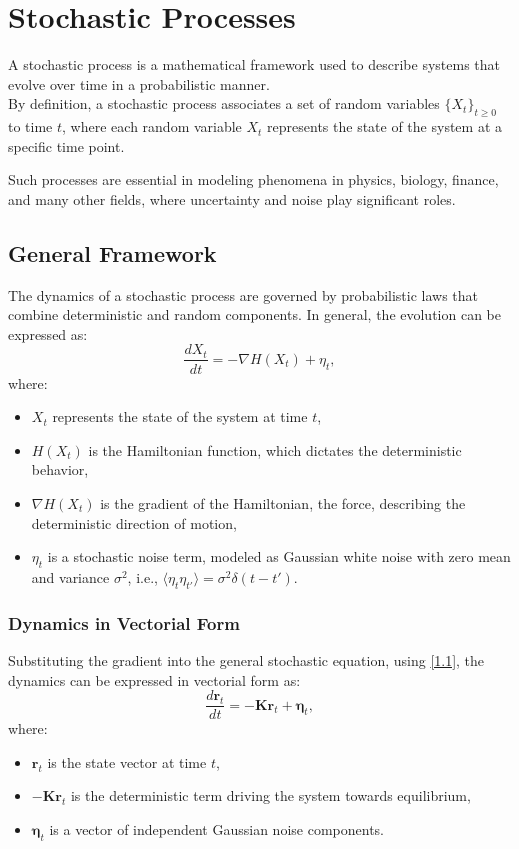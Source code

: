 \documentclass[English, Lau, oneside]{sapthesis}
\begin{document}
\chapter{Stochastic Processes}
A stochastic process is a mathematical framework used to describe systems that evolve over time in a probabilistic manner.\\
By definition, a stochastic process associates a set of random variables \( \{X_t\}_{t \geq 0} \) to time \( t \), where each random variable \( X_t \) represents the state of the system at a specific time point. 

Such processes are essential in modeling phenomena in physics, biology, finance, and many other fields, where uncertainty and noise play significant roles.
\section{General Framework}
\noindent The dynamics of a stochastic process are governed by probabilistic laws that combine deterministic and random components. In general, the evolution can be expressed as:
\begin{equation}
    \frac{dX_t}{dt} = -\nabla H(X_t) + \eta_t,
\end{equation}
where:
\begin{itemize}
    \item \( X_t \) represents the state of the system at time \( t \),
    \item \( H(X_t) \) is the Hamiltonian function, which dictates the deterministic behavior,
    \item \( \nabla H(X_t) \) is the gradient of the Hamiltonian, the force, describing the deterministic direction of motion,
    \item \( \eta_t \) is a stochastic noise term, modeled as Gaussian white noise with zero mean and variance \( \sigma^2 \), i.e., \( \langle \eta_t \eta_{t'} \rangle = \sigma^2 \delta(t-t') \).
\end{itemize}
\subsection{Dynamics in Vectorial Form}
Substituting the gradient into the general stochastic equation, using \eqref{1.1}, the dynamics can be expressed in vectorial form as:
\begin{equation}
\frac{d\mathbf{r}_t}{dt} = -\mathbf{K} \mathbf{r}_t + \boldsymbol{\eta}_t,
\end{equation}
where:
\begin{itemize}
    \item \( \mathbf{r}_t \) is the state vector at time \( t \),
    \item \( -\mathbf{K} \mathbf{r}_t \) is the deterministic term driving the system towards equilibrium,
    \item \( \boldsymbol{\eta}_t \) is a vector of independent Gaussian noise components.
\end{itemize}
\end{document}
